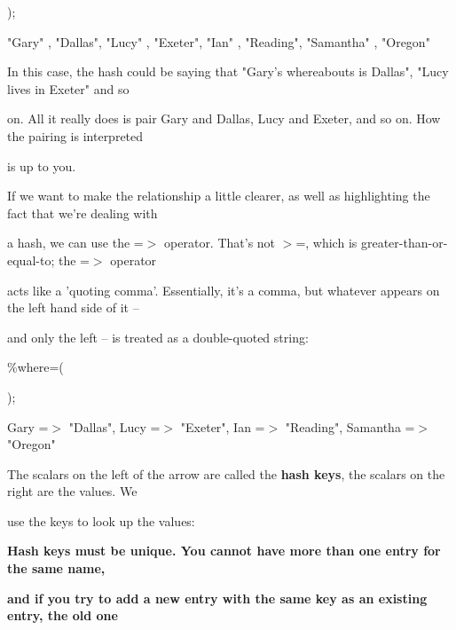 \documentclass[a4paper,11pt]{book}
\begin{document}
\noindent 

\noindent );

\noindent 

\noindent "Gary" , "Dallas", "Lucy" , "Exeter", "Ian" , "Reading", "Samantha" , "Oregon"

\noindent 

\noindent In this case, the hash could be saying that "Gary's whereabouts is Dallas", "Lucy lives in Exeter" and so

\noindent on. All it really does is pair Gary and Dallas, Lucy and Exeter, and so on. How the pairing is interpreted

\noindent is up to you.

\noindent 

\noindent If we want to make the relationship a little clearer, as well as highlighting the fact that we're dealing with

\noindent a hash, we can use the =$>$ operator. That's not $>$=, which is greater-than-or-equal-to; the =$>$ operator

\noindent acts like a 'quoting comma'. Essentially, it's a comma, but whatever appears on the left hand side of it --

\noindent and only the left -- is treated as a double-quoted string:

\noindent 

\noindent \%where=(

\noindent 

\noindent 

\noindent 

\noindent 

\noindent );

\noindent 

\noindent Gary =$>$ "Dallas", Lucy =$>$ "Exeter", Ian =$>$ "Reading", Samantha =$>$ "Oregon"

\noindent 

\noindent The scalars on the left of the arrow are called the \textbf{hash keys}, the scalars on the right are the values. We

\noindent use the keys to look up the values:

\noindent 

\noindent 

\noindent \textbf{Hash keys must be unique. You cannot have more than one entry for the same name,}

\noindent \textbf{and if you try to add a new entry with the same key as an existing entry, the old one}
\end{document}
